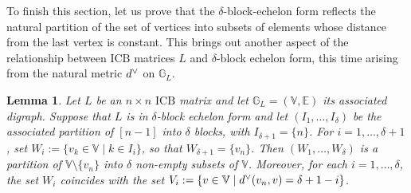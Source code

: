 \documentclass[10pt]{amsart}
\newcommand{\mbg}{\mbox{$\mathbb{G}$}}
\newcommand{\mbv}{\mbox{$\mathbb{V}$}}
\newcommand{\mbe}{\mbox{$\mathbb{E}$}}
\newcommand{\icb}{\mbox{$\mathrm{ICB}$}}
\newcommand{\ud}{\mbox{${\rm d}^\vee$}}
\newtheorem{lemma}[cdrthm]{Lemma}
\theoremstyle{definition}
\theoremstyle{remark}
\begin{document}
To finish this section, let us prove that the $\delta$-block-echelon
form reflects the natural partition of the set of vertices into
subsets of elements whose distance from the last vertex is constant.
This brings out another aspect of the relationship between $\icb$
matrices $L$ and $\delta$-block echelon form, this time arising from
the natural metric $\ud$ on $\mbg_{L}$.

\begin{lemma}\label{blockthenomega}
Let $L$ be an $n\times n$ $\icb$ matrix and let $\mbg_L=(\mbv,\mbe)$
its associated digraph. Suppose that $L$ is in $\delta$-block echelon
form and let $(I_1,\ldots, I_\delta)$ be the associated partition of
$[n-1]$ into $\delta$ blocks, with $I_{\delta+1}=\{n\}$. For
$i=1,\ldots ,\delta+1$, set $W_i:=\{v_k\in\mbv\mid k\in I_i\}$, so
that $W_{\delta+1}=\{v_n\}$. Then $(W_1,\ldots ,W_{\delta})$ is a
partition of $\mbv\setminus\{v_n\}$ into $\delta$ non-empty subsets of
$\mbv$. Moreover, for each $i=1,\ldots, \delta$, the set $W_i$
coincides with the set $V_i:=\{v\in\mbv\mid \ud(v_n,v)=\delta+1-i\}$.
\end{lemma}
\end{document}
